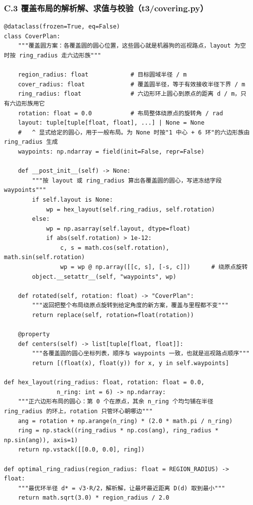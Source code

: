 \documentclass[UTF8, zihao=5,AutoFakeBold=2]{ctexart}
\begin{document}
	\subsubsection*{C.3 \quad 覆盖布局的解析解、求值与校验（t3/covering.py）}
	\begin{lstlisting}
@dataclass(frozen=True, eq=False)
class CoverPlan:
    """覆盖圆方案：各覆盖圆的圆心位置，这些圆心就是机器狗的巡视路点，layout 为空时按 ring_radius 走六边形族"""

    region_radius: float            # 目标圆域半径 / m
    cover_radius: float             # 覆盖圆半径，等于有效接收半径下界 / m
    ring_radius: float              # 六边形环上圆心到原点的距离 d / m，只有六边形族用它
    rotation: float = 0.0           # 布局整体绕原点的旋转角 / rad
    layout: tuple[tuple[float, float], ...] | None = None
    #   ^ 显式给定的圆心，用于一般布局。为 None 时按"1 中心 + 6 环"的六边形族由 ring_radius 生成
    waypoints: np.ndarray = field(init=False, repr=False)

    def __post_init__(self) -> None:
        """按 layout 或 ring_radius 算出各覆盖圆的圆心，写进冻结字段 waypoints"""
        if self.layout is None:
            wp = hex_layout(self.ring_radius, self.rotation)
        else:
            wp = np.asarray(self.layout, dtype=float)
            if abs(self.rotation) > 1e-12:
                c, s = math.cos(self.rotation), math.sin(self.rotation)
                wp = wp @ np.array([[c, s], [-s, c]])      # 绕原点旋转
        object.__setattr__(self, "waypoints", wp)

    def rotated(self, rotation: float) -> "CoverPlan":
        """返回把整个布局绕原点旋转到给定角度的新方案，覆盖与里程都不变"""
        return replace(self, rotation=float(rotation))

    @property
    def centers(self) -> list[tuple[float, float]]:
        """各覆盖圆的圆心坐标列表，顺序与 waypoints 一致，也就是巡视路点顺序"""
        return [(float(x), float(y)) for x, y in self.waypoints]

def hex_layout(ring_radius: float, rotation: float = 0.0,
               n_ring: int = 6) -> np.ndarray:
    """正六边形布局的圆心：第 0 个在原点，其余 n_ring 个均匀铺在半径 ring_radius 的环上，rotation 只管环心朝哪边"""
    ang = rotation + np.arange(n_ring) * (2.0 * math.pi / n_ring)
    ring = np.stack((ring_radius * np.cos(ang), ring_radius * np.sin(ang)), axis=1)
    return np.vstack([[0.0, 0.0], ring])

def optimal_ring_radius(region_radius: float = REGION_RADIUS) -> float:
    """最优环半径 d* = √3·R/2，解析解，让最坏最近距离 D(d) 取到最小"""
    return math.sqrt(3.0) * region_radius / 2.0


\end{lstlisting}
\end{document}
